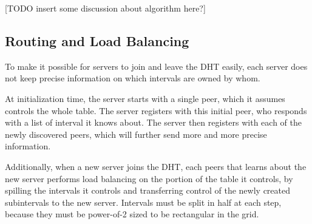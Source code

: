 [TODO insert some discussion about algorithm here?]

\subsection{Routing and Load Balancing}

To make it possible for servers to join and leave the DHT easily, each server does not keep precise information on which intervals are owned by whom.

At initialization time, the server starts with a single peer, which it assumes controls the whole table.
The server registers with this initial peer, who responds with a list of interval it knows about.
The server then registers with each of the newly discovered peers, which will further send more and more precise information.

Additionally, when a new server joins the DHT, each peers that learns about the new server performs load balancing on the portion of the table it controls, by spilling the intervals it controls and transferring control of the newly created subintervals to the new server.
Intervals must be split in half at each step, because they must be power-of-2 sized to be rectangular in the grid.

